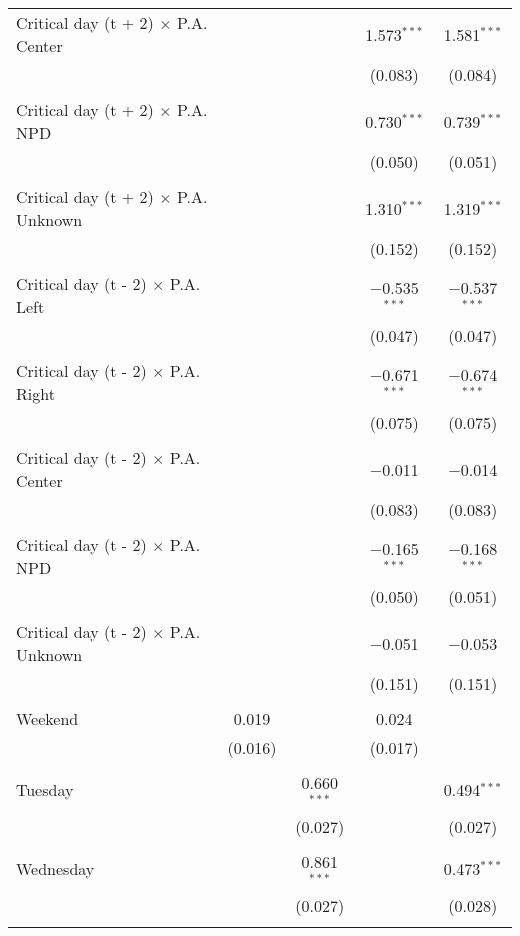 \documentclass[
]{article}
\begin{document}
\begin{table}[!htbp]
{\begin{tabular}{@{\extracolsep{5pt}}lcccc}
 Critical day (t + 2) $\times$ P.A. Center &  &  & 1.573$^{***}$ & 1.581$^{***}$ \\ 
  &  &  & (0.083) & (0.084) \\ 
  & & & & \\ 
 Critical day (t + 2) $\times$ P.A. NPD &  &  & 0.730$^{***}$ & 0.739$^{***}$ \\ 
  &  &  & (0.050) & (0.051) \\ 
  & & & & \\ 
 Critical day (t + 2) $\times$ P.A. Unknown &  &  & 1.310$^{***}$ & 1.319$^{***}$ \\ 
  &  &  & (0.152) & (0.152) \\ 
  & & & & \\ 
 Critical day (t - 2) $\times$ P.A. Left &  &  & $-$0.535$^{***}$ & $-$0.537$^{***}$ \\ 
  &  &  & (0.047) & (0.047) \\ 
  & & & & \\ 
 Critical day (t - 2) $\times$ P.A. Right &  &  & $-$0.671$^{***}$ & $-$0.674$^{***}$ \\ 
  &  &  & (0.075) & (0.075) \\ 
  & & & & \\ 
 Critical day (t - 2) $\times$ P.A. Center &  &  & $-$0.011 & $-$0.014 \\ 
  &  &  & (0.083) & (0.083) \\ 
  & & & & \\ 
 Critical day (t - 2) $\times$ P.A. NPD &  &  & $-$0.165$^{***}$ & $-$0.168$^{***}$ \\ 
  &  &  & (0.050) & (0.051) \\ 
  & & & & \\ 
 Critical day (t - 2) $\times$ P.A. Unknown &  &  & $-$0.051 & $-$0.053 \\ 
  &  &  & (0.151) & (0.151) \\ 
  & & & & \\ 
 Weekend & 0.019 &  & 0.024 &  \\ 
  & (0.016) &  & (0.017) &  \\ 
  & & & & \\ 
 Tuesday &  & 0.660$^{***}$ &  & 0.494$^{***}$ \\ 
  &  & (0.027) &  & (0.027) \\ 
  & & & & \\ 
 Wednesday &  & 0.861$^{***}$ &  & 0.473$^{***}$ \\ 
  &  & (0.027) &  & (0.028) \\ 
  & & & & \\ 

\end{tabular}}
\end{table}
\end{document}
